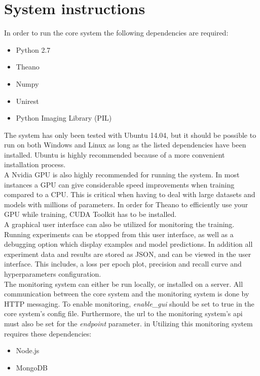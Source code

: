 \section{System instructions}
\label{app:system_instructions}
In order to run the core system the following dependencies are required:
\begin{itemize}
\item Python 2.7
\item Theano
\item Numpy
\item Unirest
\item Python Imaging Library (PIL)
\end{itemize}

The system has only been tested with Ubuntu 14.04, but it should be possible to run on both Windows and Linux as long as the listed dependencies have been installed. Ubuntu is highly recommended because of a more convenient installation process. \\

A Nvidia GPU is also highly recommended for running the system. In most instances a GPU can give considerable speed improvements when training compared to a CPU. This is critical when having to deal with large datasets and models with millions of parameters. In order for Theano to efficiently use your GPU while training, CUDA Toolkit has to be installed. \\

A graphical user interface can also be utilized for monitoring the training. Running experiments can be stopped from this user interface, as well as a debugging option which display examples and model predictions. In addition all experiment data and results are stored as JSON, and can be viewed in the user interface. This includes, a loss per epoch plot, precision and recall curve and hyperparameters configuration. \\

The monitoring system can either be run locally, or installed on a server. All communication between the core system and the monitoring system is done by HTTP messaging. To enable monitoring, {\it enable\_gui} should be set to true in the core system's config file. Furthermore, the url to the monitoring system's api must also be set for the {\it endpoint} parameter. in  Utilizing this monitoring system requires these dependencies:
\begin{itemize}
\item Node.js
\item MongoDB
\end{itemize}

